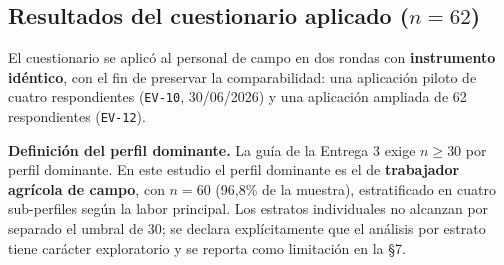 \documentclass[11pt,a4paper]{article}
\newcommand{\id}[1]{\texttt{\begingroup\hyphenpenalty=10000\relax#1\endgroup}}
\renewcommand{\id}[1]{\texttt{#1}}
\begin{document}
\subsection[Resultados del cuestionario aplicado (n=62)]{Resultados del cuestionario aplicado ($n=62$)}

El cuestionario se aplicó al personal de campo en dos rondas con \textbf{instrumento idéntico}, con
el fin de preservar la comparabilidad: una aplicación piloto de cuatro respondientes
(\id{EV-10}, 30/06/2026) y una aplicación ampliada de 62 respondientes (\id{EV-12}).

\textbf{Definición del perfil dominante.} La guía de la Entrega 3 exige $n \geq 30$ por perfil
dominante. En este estudio el perfil dominante es el de \textbf{trabajador agrícola de campo}, con
$n = 60$ (96{,}8\% de la muestra), estratificado en cuatro sub-perfiles según la labor principal.
Los estratos individuales no alcanzan por separado el umbral de 30; se declara explícitamente que el
análisis por estrato tiene carácter exploratorio y se reporta como limitación en la §7.
\end{document}
